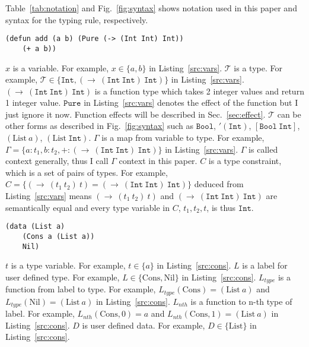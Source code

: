 \documentclass{article}
\begin{document}
Table~\ref{tab:notation} and Fig.~\ref{fig:syntax} shows notation used in this paper
and syntax for the typing rule, respectively.

\begin{lstlisting}[caption=Example of variable and type,label=src:vars]
(defun add (a b) (Pure (-> (Int Int) Int))
    (+ a b))
\end{lstlisting}

$x$ is a variable.
For example, $x \in \{a, b\}$ in Listing~\ref{src:vars}.
$\mathcal{T}$ is a type.
For example, $\mathcal{T} \in \{\mathtt{Int}, (\rightarrow\ (\mathtt{Int}\ \mathtt{Int})\ \mathtt{Int})\}$
in Listing~\ref{src:vars}.
$(\rightarrow\ (\mathtt{Int}\ \mathtt{Int})\ \mathtt{Int})$ is a function type which takes 2 integer values
and return 1 integer value.
$\mathtt{Pure}$ in Listing~\ref{src:vars} denotes the effect of the function but I just ignore it now.
Function effects will be described in Sec.~\ref{sec:effect}.
$\mathcal{T}$ can be other forms as described in Fig.~\ref{fig:syntax} such as
$\mathtt{Bool}$, $'(\mathtt{Int})$, $[\mathtt{Bool}\ \mathtt{Int}]$, $(\mathrm{List}\ a)$, $(\mathrm{List}\ \mathtt{Int})$.
$\Gamma$ is a map from variable to type.
For example, $\Gamma = \{a : t_1, b : t_2, + : (\rightarrow\ (\mathtt{Int}\ \mathtt{Int})\ \mathtt{Int})\}$
in Listing~\ref{src:vars}.
$\Gamma$ is called context generally, thus I call $\Gamma$ context in this paper.
$C$ is a type constraint, which is a set of pairs of types.
For example, $C = \{(\rightarrow\ (t_1\ t_2)\ t) = (\rightarrow\ (\mathtt{Int}\ \mathtt{Int})\ \mathtt{Int})\}$ deduced from
Listing~\ref{src:vars} means $(\rightarrow\ (t_1\ t_2)\ t)$ and $(\rightarrow\ (\mathtt{Int}\ \mathtt{Int})\ \mathtt{Int})$ are
semantically equal and every type variable in $C$, $t_1, t_2, t$, is thus $\mathtt{Int}$.

\begin{lstlisting}[caption=Example of user defined data type,label=src:cons]
(data (List a)
    (Cons a (List a))
    Nil)
\end{lstlisting}

$t$ is a type variable.
For example, $t \in \{a\}$ in Listing~\ref{src:cons}.
$L$ is a label for user defined type.
For example, $L \in \{\mathrm{Cons}, \mathrm{Nil}\}$ in Listing~\ref{src:cons}.
$L_{type}$ is a function from label to type.
For example, $L_{type}(\mathrm{Cons}) = (\mathrm{List}\ a)$ and $L_{type}(\mathrm{Nil}) = (\mathrm{List}\ a)$
in Listing~\ref{src:cons}.
$L_{nth}$ is a function to n-th type of label.
For example, $L_{nth}(\mathrm{Cons}, 0) = a$ and $L_{nth}(\mathrm{Cons}, 1) = (\mathrm{List}\ a)$ in Listing~\ref{src:cons}.
$D$ is user defined data.
For example, $D \in \{\mathrm{List}\}$ in Listing~\ref{src:cons}.
\end{document}
